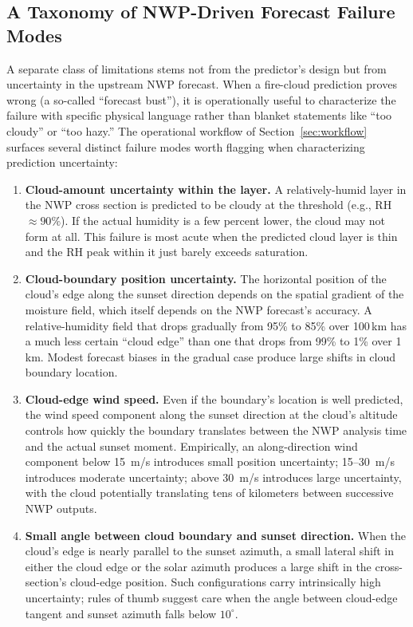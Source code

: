 \documentclass[11pt,a4paper]{article}
\begin{document}
\subsection{A Taxonomy of NWP-Driven Forecast Failure Modes}
\label{sec:failuremodes}

A separate class of limitations stems not from the predictor's design but from uncertainty in the upstream NWP forecast. When a fire-cloud prediction proves wrong (a so-called ``forecast bust''), it is operationally useful to characterize the failure with specific physical language rather than blanket statements like ``too cloudy'' or ``too hazy.'' The operational workflow of Section~\ref{sec:workflow} surfaces several distinct failure modes worth flagging when characterizing prediction uncertainty:

\begin{enumerate}
\item \textbf{Cloud-amount uncertainty within the layer.} A relatively-humid layer in the NWP cross section is predicted to be cloudy at the threshold (e.g., RH $\approx 90\%$). If the actual humidity is a few percent lower, the cloud may not form at all. This failure is most acute when the predicted cloud layer is thin and the RH peak within it just barely exceeds saturation.
\item \textbf{Cloud-boundary position uncertainty.} The horizontal position of the cloud's edge along the sunset direction depends on the spatial gradient of the moisture field, which itself depends on the NWP forecast's accuracy. A relative-humidity field that drops gradually from 95\% to 85\% over 100\,km has a much less certain ``cloud edge'' than one that drops from 99\% to 1\% over 1\,km. Modest forecast biases in the gradual case produce large shifts in cloud boundary location.
\item \textbf{Cloud-edge wind speed.} Even if the boundary's location is well predicted, the wind speed component along the sunset direction at the cloud's altitude controls how quickly the boundary translates between the NWP analysis time and the actual sunset moment. Empirically, an along-direction wind component below 15~m/s introduces small position uncertainty; 15--30~m/s introduces moderate uncertainty; above 30~m/s introduces large uncertainty, with the cloud potentially translating tens of kilometers between successive NWP outputs.
\item \textbf{Small angle between cloud boundary and sunset direction.} When the cloud's edge is nearly parallel to the sunset azimuth, a small lateral shift in either the cloud edge or the solar azimuth produces a large shift in the cross-section's cloud-edge position. Such configurations carry intrinsically high uncertainty; rules of thumb suggest care when the angle between cloud-edge tangent and sunset azimuth falls below $10^\circ$.

\end{enumerate}
\end{document}
